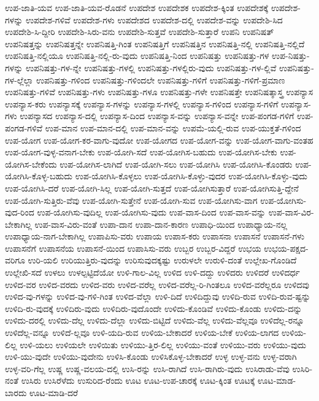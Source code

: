 {ಉಪ-ಜಾತಿ-ಯವ
ಉಪ-ಜಾತಿ-ಯವ-ರೊಡನೆ
ಉಪದೇಶ
ಉಪದೇಶಕ
ಉಪದೇಶ-ಕ್ಕಿಂತ
ಉಪದೇಶಕ್ಕೆ
ಉಪದೇಶ-ಗಳನ್ನು
ಉಪದೇಶ-ಗಳಿವೆ
ಉಪದೇಶ-ಗಳು
ಉಪದೇಶದ
ಉಪದೇಶ-ದಲ್ಲಿ
ಉಪದೇಶ-ವನ್ನು
ಉಪದೇಶಿ-ಸಿದ
ಉಪದೇಶಿ-ಸಿ-ದ್ದೀರಿ
ಉಪದೇಶಿ-ಸಿರು-ವನು
ಉಪದೇಶಿ-ಸುತ್ತವೆ
ಉಪದೇಶಿ-ಸುತ್ತಾರೆ
ಉಪನಿ
ಉಪನಿಷತ್
ಉಪನಿಷತ್ತನ್ನು
ಉಪನಿಷತ್ತನ್ನೇ
ಉಪನಿಷತ್ತಿ-ಗಿಂತ
ಉಪನಿಷತ್ತಿಗೆ
ಉಪನಿಷತ್ತಿನ
ಉಪನಿಷತ್ತಿ-ನಲ್ಲಿ
ಉಪನಿಷತ್ತಿ-ನಲ್ಲಿದೆ
ಉಪನಿಷತ್ತಿ-ನಲ್ಲಿಯೂ
ಉಪನಿಷತ್ತಿ-ನಲ್ಲಿ-ರು-ವುದು
ಉಪನಿಷತ್ತಿ-ನಿಂದ
ಉಪನಿಷತ್ತು
ಉಪನಿಷತ್ತು-ಗಳ
ಉಪ-ನಿಷತ್ತು-ಗಳನ್ನು
ಉಪನಿಷತ್ತು-ಗಳ-ನ್ನೇ
ಉಪನಿಷತ್ತು-ಗಳಲ್ಲಿ
ಉಪನಿಷತ್ತು-ಗಳಲ್ಲಿರು-ವುದು
ಉಪನಿಷತ್ತು-ಗಳ-ಲ್ಲಿವೆ
ಉಪನಿಷತ್ತು-ಗಳ-ಲ್ಲೆಲ್ಲಾ
ಉಪನಿಷತ್ತು-ಗಳಿಂದ
ಉಪನಿಷತ್ತು-ಗಳಿಂದಲೇ
ಉಪನಿಷತ್ತು-ಗಳಿಗೆ
ಉಪನಿಷತ್ತು-ಗಳಿಗೆ-ಪ್ರಮಾಣ
ಉಪನಿಷತ್ತು-ಗಳಿವೆ
ಉಪನಿಷತ್ತು-ಗಳು
ಉಪನಿಷತ್ತು-ಗಳೂ
ಉಪನಿಷತ್ತು-ಗಳೇ
ಉಪನಿಷತ್ತೇ
ಉಪನಿಷತ್ಶಾಸ್ತ್ರ
ಉಪನ್ಯಾಸ
ಉಪನ್ಯಾಸ-ಕರು
ಉಪನ್ಯಾಸಕ್ಕೆ
ಉಪನ್ಯಾಸ-ಗಳನ್ನು
ಉಪನ್ಯಾಸ-ಗಳಲ್ಲಿ
ಉಪನ್ಯಾಸ-ಗಳಿಂದ
ಉಪನ್ಯಾಸ-ಗಳಿಗೆ
ಉಪನ್ಯಾಸ-ಗಳು
ಉಪನ್ಯಾಸದ
ಉಪನ್ಯಾಸ-ದಲ್ಲಿ
ಉಪನ್ಯಾಸ-ದಿಂದ
ಉಪನ್ಯಾಸ-ವನ್ನು
ಉಪನ್ಯಾಸ-ವನ್ನೇ
ಉಪ-ಪಂಗಡ-ಗಳಿಗೆ
ಉಪ-ಪಂಗಡ-ಗಳಿವೆ
ಉಪ-ಮಾನ
ಉಪ-ಮಾನ-ದಲ್ಲಿ
ಉಪ-ಮಾನ-ವನ್ನು
ಉಪಮೆ-ಯಲ್ಲಿ-ರುವ
ಉಪ-ಯುಕ್ತತೆ-ಗಳಿಂದ
ಉಪ-ಯೋಗ
ಉಪ-ಯೋಗ-ಕರ-ವಾಗು-ವುದೋ
ಉಪ-ಯೋಗದ
ಉಪ-ಯೋಗ-ವನ್ನು
ಉಪ-ಯೋಗ-ವಾಗು-ವಂತಹ
ಉಪ-ಯೋಗ-ವುಳ್ಳ-ವನಾಗ-ಬೇಕು
ಉಪ-ಯೋಗಿ-ಸದೆ
ಉಪ-ಯೋಗಿಸ-ಬಹುದು
ಉಪ-ಯೋಗಿಸ-ಬೇಕು
ಉಪ-ಯೋಗಿಸ-ಬೇಕೆಂದು
ಉಪ-ಯೋಗಿಸ-ಲಾಗಿದೆ
ಉಪ-ಯೋಗಿ-ಸಲು
ಉಪ-ಯೋಗಿಸಿ
ಉಪ-ಯೋಗಿಸಿ-ಕೊಂಡರು
ಉಪ-ಯೋಗಿಸಿ-ಕೊಳ್ಳ-ಬಹುದು
ಉಪ-ಯೋಗಿಸಿ-ಕೊಳ್ಳಲು
ಉಪ-ಯೋಗಿಸಿ-ಕೊಳ್ಳು-ವುದರ
ಉಪ-ಯೋಗಿಸಿ-ಕೊಳ್ಳು-ವುದು
ಉಪ-ಯೋಗಿಸಿ-ದರೆ
ಉಪ-ಯೋಗಿ-ಸಿಲ್ಲ
ಉಪ-ಯೋಗಿ-ಸುತ್ತದೆ
ಉಪ-ಯೋಗಿಸುತ್ತಾರೆ
ಉಪ-ಯೋಗಿಸುತ್ತಿ-ದ್ದೇನೆ
ಉಪ-ಯೋಗಿ-ಸುತ್ತಿರು-ವೆವು
ಉಪ-ಯೋಗಿ-ಸುತ್ತೇನೆ
ಉಪ-ಯೋಗಿ-ಸುವ
ಉಪ-ಯೋಗಿಸು-ವಾಗ
ಉಪ-ಯೋಗಿಸು-ವುದ-ರಿಂದ
ಉಪ-ಯೋಗಿಸು-ವುದಿಲ್ಲ
ಉಪ-ಯೋಗಿಸು-ವುದು
ಉಪ-ವಾಸ-ದಿಂದ
ಉಪ-ವಾಸ-ವನ್ನು
ಉಪ-ವಾಸ-ವಿರ-ಬೇಕಾಗಿಲ್ಲ
ಉಪ-ವಾಸ-ವಿರು-ವಂತೆ
ಉಪಾ-ದಾನ
ಉಪಾ-ದಾನ-ಕಾರಣ
ಉಪಾಧಿ-ಯಿಂದ
ಉಪಾಧ್ಯಾಯ-ನಲ್ಲ
ಉಪಾಧ್ಯಾಯ-ನಾಗ-ಬೇಕಾಗಿಲ್ಲ
ಉಪಾಪಿಸು-ವರು
ಉಪಾಯ
ಉಪಾಸ-ಕರು
ಉಪಾಸನಾ
ಉಪಾಸನೆ
ಉಪಾಸನೆ-ಗಳು
ಉಪಾಸನೆಗೆ
ಉಪಾಸನೆಯ
ಉಪಾಸನೆ-ಯಿಂದ
ಉಪಾಸಿಸು-ವರು
ಉಬ್ಬರ
ಉಬ್ಬರ-ವಿದ್ದರೆ
ಉಭಯ
ಉಭಯ-ಪಕ್ಷದ-ವರಿಗೂ
ಉರಿ-ಯಲಿ
ಉರಿಯುತ್ತಿರು-ವುದನ್ನು
ಉರಿಸುವುದಕ್ಕಷ್ಟು
ಉರುಳಲೇ
ಉರುಳಿ-ದಂತೆ
ಉಲ್ಲೇಖ-ಗೊಂಡಿದೆ
ಉಲ್ಲೇಖಿ-ಸದೆ
ಉಳಲು
ಉಳಲ್ಪಟ್ಟಿದೆಯೋ
ಉಳಿ-ಗಾಲ-ವಿಲ್ಲ
ಉಳಿದ
ಉಳಿ-ದದ್ದು
ಉಳಿದರು
ಉಳಿದರೆ
ಉಳಿದರ್ಧ
ಉಳಿದ-ವರ
ಉಳಿದ-ವರದು
ಉಳಿದ-ವರು
ಉಳಿದ-ವರೆಲ್ಲ
ಉಳಿದ-ವರೆಲ್ಲ-ರಿ-ಗಿಂತಲೂ
ಉಳಿದ-ವರೆಲ್ಲರೂ
ಉಳಿದವು
ಉಳಿದ-ವು-ಗಳನ್ನು
ಉಳಿದ-ವು-ಗಳಿ-ಗಿಂತ
ಉಳಿದ-ವೆಲ್ಲಾ
ಉಳಿ-ದಿದೆ
ಉಳಿದಿದ್ದುವು
ಉಳಿದಿ-ರುವ
ಉಳಿದಿ-ರುವ-ಷ್ಟನ್ನು
ಉಳಿದಿ-ರು-ವುದಕ್ಕೆ
ಉಳಿದಿರು-ವುದು
ಉಳಿದಿರು-ವುದೊಂದೇ
ಉಳಿದು-ಕೊಂಡಿವೆ
ಉಳಿದು-ಕೊಂಡು
ಉಳಿದು-ದನ್ನು
ಉಳಿದು-ದರಲ್ಲಿ
ಉಳಿದು-ದೆಲ್ಲ
ಉಳಿದು-ದೆಲ್ಲಾ
ಉಳಿದು-ಬಿಟ್ಟಿದೆ
ಉಳಿದು-ವೆಲ್ಲ
ಉಳಿದು-ವೆಲ್ಲವೂ
ಉಳಿದೆಲ್ಲ-ರನ್ನೂ
ಉಳಿದೆಲ್ಲ-ವನ್ನೂ
ಉಳಿದೆ-ಲ್ಲವೂ
ಉಳಿ-ಯದಿ-ರುವ
ಉಳಿಯ-ಬೇಕಾದರೆ
ಉಳಿಯ-ಬೇಕೆ
ಉಳಿಯ-ಲಾಗದ
ಉಳಿಯ-ಲಿಲ್ಲ
ಉಳಿ-ಯಲು
ಉಳಿಯಲೇ
ಉಳಿಯಿತು
ಉಳಿಯು-ತ್ತಿರ-ಲಿಲ್ಲ
ಉಳಿಯು-ವಂತೆ
ಉಳಿಯು-ವರು
ಉಳಿಯು-ವುದು
ಉಳಿ-ಯು-ವುದೇ
ಉಳಿಯು-ವುದೇನು
ಉಳಿಸಿ-ಕೊಂಡು
ಉಳಿಸಿಕೊಳ್ಳ-ಬೇಕಾದರೆ
ಉಳ್ಳ
ಉಳ್ಳ-ವನು
ಉಳ್ಳ-ವರಾಗಿ
ಉಳ್ಳ-ವರಿ-ಗೆಲ್ಲ
ಉಷ್ಣ
ಉಷ್ಣ-ವಲಯ-ದಲ್ಲಿ
ಉಸಿ-ರನ್ನು
ಉಸಿ-ರಾಗಿದೆ
ಉಸಿ-ರಾಗಿರು-ವುದು
ಉಸಿರಾಡು-ವೆವು
ಉಸಿರಿ-ನಂತೆ
ಉಸಿರು
ಉಸಿರೆಳೆದು
ಉಸುರಿದ-ರೆಂದು
ಊಟ
ಊಟ-ಉಪ-ಚಾರಕ್ಕೆ
ಊಟ-ಕ್ಕಿಂತ
ಊಟಕ್ಕೆ
ಊಟ-ಮಾಡ-ಬಾರದು
ಊಟ-ಮಾಡಿ-ದರೆ
}
